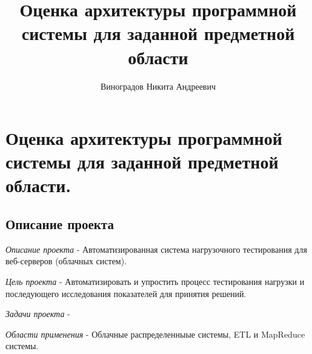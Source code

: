 \documentclass[PI,LAB]{HSEUniversity}
\title{Оценка архитектуры программной системы для заданной предметной области}
\author{Виноградов Никита Андреевич}
\begin{document}
    \maketitle



\chapter{Оценка архитектуры программной системы для заданной предметной области. }
\section {Описание проекта}
\emph{Описание проекта} - Автоматизированная система нагрузочного тестирования для веб-серверов (облачных систем).

\emph{Цель проекта} - Автоматизировать и упростить процесс тестирования нагрузки и последующего исследования показателей для принятия решений.

\emph{Задачи проекта} -

\emph{Области применения} - Облачные  распределенныые системы,  ETL и MapReduce системы.
\end{document}
